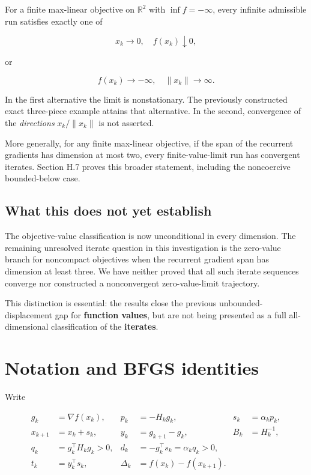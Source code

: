 \documentclass[10pt,oneside,openany]{book}
\theoremstyle{remark}\newtheorem{remark}{Remark}[chapter]
\begin{document}
For a finite max-linear objective on \(\mathbb R^2\) with
\(\inf f=-\infty\), every infinite admissible run satisfies exactly one
of

\[
\boxed{x_k\longrightarrow0,\quad f(x_k)\downarrow0,}
\]

or

\[
\boxed{f(x_k)\longrightarrow-\infty,\quad\|x_k\|\longrightarrow\infty.}
\]

In the first alternative the limit is nonstationary. The previously
constructed exact three-piece example attains that alternative. In the
second, convergence of the \emph{directions} \(x_k/\|x_k\|\) is not
asserted.

More generally, for any finite max-linear objective, if the span of the
recurrent gradients has dimension at most two, every finite-value-limit
run has convergent iterates. Section H.7 proves this broader statement,
including the noncoercive bounded-below case.

\subsection{What this does not yet
establish}\label{H:what-this-does-not-yet-establish}

The objective-value classification is now unconditional in every
dimension. The remaining unresolved iterate question in this
investigation is the zero-value branch for noncompact objectives when
the recurrent gradient span has dimension at least three. We have
neither proved that all such iterate sequences converge nor constructed
a nonconvergent zero-value-limit trajectory.

This distinction is essential: the results close the previous
unbounded-displacement gap for \textbf{function values}, but are not
being presented as a full all-dimensional classification of the
\textbf{iterates}.


\setcounter{section}{1}
\setcounter{theorem}{0}
\setcounter{lemma}{0}
\setcounter{corollary}{0}
\setcounter{proposition}{0}
\setcounter{remark}{0}
\setcounter{equation}{0}
\section{Notation and BFGS
identities}\label{H:notation-and-bfgs-identities}

Write

\[
\begin{aligned}
g_k&=\nabla f(x_k),&p_k&=-H_kg_k,&s_k&=\alpha_kp_k,\\
x_{k+1}&=x_k+s_k,&y_k&=g_{k+1}-g_k,&B_k&=H_k^{-1},\\
q_k&=g_k^\top H_kg_k>0,&d_k&=-g_k^\top s_k=\alpha_kq_k>0,\\
t_k&=y_k^\top s_k,&\Delta_k&=f(x_k)-f(x_{k+1}).
\end{aligned}
\]
\end{document}
